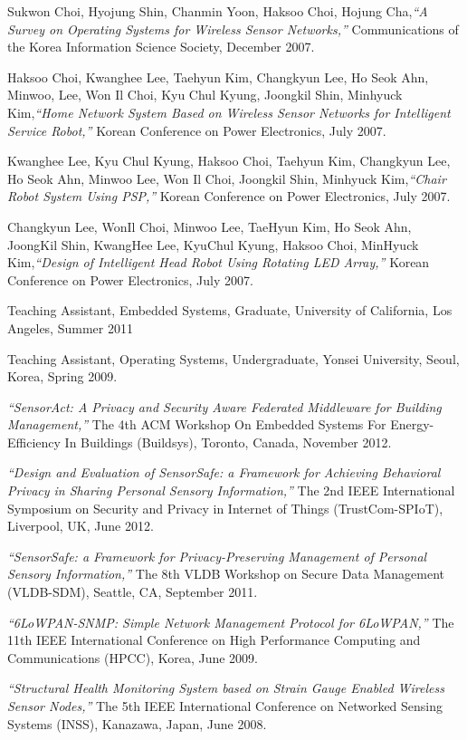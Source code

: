 \documentclass[12pt,letterpaper]{article}
\newcommand{\mhead}[1]{\leavevmode\marginpar{\sffamily\footnotesize #1}}
\begin{document}
\bigskip
Sukwon Choi, Hyojung Shin, Chanmin Yoon, Haksoo Choi, Hojung Cha,\emph{``A Survey on Operating Systems for Wireless Sensor Networks,''} Communications of the Korea Information Science Society, December 2007.

\bigskip
Haksoo Choi, Kwanghee Lee, Taehyun Kim, Changkyun Lee, Ho Seok Ahn, Minwoo, Lee, Won Il Choi, Kyu Chul Kyung, Joongkil Shin, Minhyuck Kim,\emph{``Home Network System Based on Wireless Sensor Networks for Intelligent Service Robot,''} Korean Conference on Power Electronics, July 2007.

\bigskip
Kwanghee Lee, Kyu Chul Kyung, Haksoo Choi, Taehyun Kim, Changkyun Lee, Ho Seok Ahn, Minwoo Lee, Won Il Choi, Joongkil Shin, Minhyuck Kim,\emph{``Chair Robot System Using PSP,''} Korean Conference on Power Electronics, July 2007.

\bigskip
Changkyun Lee, WonIl Choi, Minwoo Lee, TaeHyun Kim, Ho Seok Ahn, JoongKil Shin, KwangHee Lee, KyuChul Kyung, Haksoo Choi, MinHyuck Kim,\emph{``Design of Intelligent Head Robot Using Rotating LED Array,''} Korean Conference on Power Electronics, July 2007.

\bigskip
\mhead{Teaching}%
Teaching Assistant, Embedded Systems, Graduate, University of California, Los Angeles, Summer 2011

\medskip
Teaching Assistant, Operating Systems, Undergraduate, Yonsei University, Seoul, Korea, Spring 2009.

\bigskip
\mhead{Talks}%
\emph{``SensorAct: A Privacy and Security Aware Federated Middleware for Building Management,''} The 4th ACM Workshop On Embedded Systems For Energy-Efficiency In Buildings (Buildsys), Toronto, Canada, November 2012.

\bigskip
\emph{``Design and Evaluation of SensorSafe: a Framework for Achieving Behavioral Privacy in Sharing Personal Sensory Information,''} The 2nd IEEE International Symposium on Security and Privacy in Internet of Things (TrustCom-SPIoT), Liverpool, UK, June 2012.

\bigskip
\emph{``SensorSafe: a Framework for Privacy-Preserving Management of Personal Sensory Information,''} The 8th VLDB Workshop on Secure Data Management (VLDB-SDM), Seattle, CA, September 2011.

\bigskip
\emph{``6LoWPAN-SNMP: Simple Network Management Protocol for 6LoWPAN,''} The 11th IEEE International Conference on High Performance Computing and Communications (HPCC), Korea, June 2009.

\bigskip
\emph{``Structural Health Monitoring System based on Strain Gauge Enabled Wireless Sensor Nodes,''} The 5th IEEE International Conference on Networked Sensing Systems (INSS), Kanazawa, Japan, June 2008.
\end{document}
